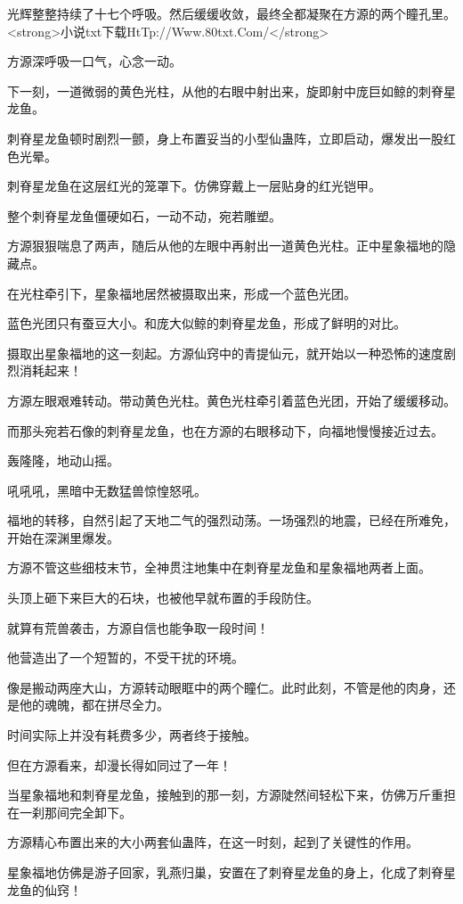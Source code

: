 \begin{this_body}
光辉整整持续了十七个呼吸。然后缓缓收敛，最终全都凝聚在方源的两个瞳孔里。<strong>小说txt下载HtTp://Www.80txt.Com/</strong>

方源深呼吸一口气，心念一动。

下一刻，一道微弱的黄色光柱，从他的右眼中射出来，旋即射中庞巨如鲸的刺脊星龙鱼。

刺脊星龙鱼顿时剧烈一颤，身上布置妥当的小型仙蛊阵，立即启动，爆发出一股红色光晕。

刺脊星龙鱼在这层红光的笼罩下。仿佛穿戴上一层贴身的红光铠甲。

整个刺脊星龙鱼僵硬如石，一动不动，宛若雕塑。

方源狠狠喘息了两声，随后从他的左眼中再射出一道黄色光柱。正中星象福地的隐藏点。

在光柱牵引下，星象福地居然被摄取出来，形成一个蓝色光团。

蓝色光团只有蚕豆大小。和庞大似鲸的刺脊星龙鱼，形成了鲜明的对比。

摄取出星象福地的这一刻起。方源仙窍中的青提仙元，就开始以一种恐怖的速度剧烈消耗起来！

方源左眼艰难转动。带动黄色光柱。黄色光柱牵引着蓝色光团，开始了缓缓移动。

而那头宛若石像的刺脊星龙鱼，也在方源的右眼移动下，向福地慢慢接近过去。

轰隆隆，地动山摇。

吼吼吼，黑暗中无数猛兽惊惶怒吼。

福地的转移，自然引起了天地二气的强烈动荡。一场强烈的地震，已经在所难免，开始在深渊里爆发。

方源不管这些细枝末节，全神贯注地集中在刺脊星龙鱼和星象福地两者上面。

头顶上砸下来巨大的石块，也被他早就布置的手段防住。

就算有荒兽袭击，方源自信也能争取一段时间！

他营造出了一个短暂的，不受干扰的环境。

像是搬动两座大山，方源转动眼眶中的两个瞳仁。此时此刻，不管是他的肉身，还是他的魂魄，都在拼尽全力。

时间实际上并没有耗费多少，两者终于接触。

但在方源看来，却漫长得如同过了一年！

当星象福地和刺脊星龙鱼，接触到的那一刻，方源陡然间轻松下来，仿佛万斤重担在一刹那间完全卸下。

方源精心布置出来的大小两套仙蛊阵，在这一时刻，起到了关键性的作用。

星象福地仿佛是游子回家，乳燕归巢，安置在了刺脊星龙鱼的身上，化成了刺脊星龙鱼的仙窍！


\end{this_body}
